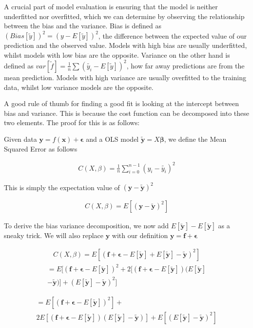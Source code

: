 \documentclass[twocolumn,10pt,cleanfoot]{asme2ej}
\begin{document}
A crucial part of model evaluation is ensuring that the model is neither underfitted nor overfitted, which we can determine by observing the relationship between the bias and the variance. Bias is defined as $(Bias[\tilde{y}])^2 = (y-E[\tilde{y}])^2$, the difference between the expected value of our prediction and the observed value. Models with high bias are usually underfitted, whilst models with low bias are the opposite. Variance on the other hand is defined as $var[\tilde{f}] = \frac{1}{n}\sum(\tilde{y_i}-E[\tilde{y}])^2$, how far away predictions are from the mean prediction. Models with high variance are usually overfitted to the training data, whilst low variance models are the opposite.

A good rule of thumb for finding a good fit is looking at the intercept between bias and variance. This is because the cost function can be decomposed into these two elements. The proof for this is as follows:

Given data $\bm{y} = f(\bm{x}) + \bm{\epsilon}$ and a OLS model $\bm{\tilde{y}} = X\bm{\beta}$, we define
the Mean Squared Error as follows

\begin{gather}
C(X,\beta) = \frac{1}{n}\sum_{i=0}^{n-1}(y_i - \tilde{y_i})^2
\end{gather}

This is simply the expectation value of $(\bm{y} - \bm{\tilde{y}})^2$

\begin{gather}
C(X,\beta) = E\left[(\bm{y} - \bm{\tilde{y}})^2\right]
\end{gather}

To derive the bias variance decomposition, we now add $E[\bm{\tilde{y}}] - E[\bm{\tilde{y}}]$ 
as a sneaky trick. We will also replace $\bm{y}$ with our definition $\bm{y} = \bm{f} + \bm{\epsilon}$

\begin{gather}
C(X,\beta) = E\left[(\bm{f} + \bm{\epsilon} - E[\bm{\tilde{y}}] + E[\bm{\tilde{y}}] - \bm{\tilde{y}})^2\right]
\end{gather}
\begin{multline}
= E[(\bm{f} + \bm{\epsilon} - E[\bm{\tilde{y}}])^2 + 2[(\bm{f} + \bm{\epsilon} - E[\bm{\tilde{y}}])(E[\bm{\tilde{y}}] \\
	- \bm{\tilde{y}})] +(E[\bm{\tilde{y}}] - \bm{\tilde{y}})^2]
\end{multline}

\begin{multline}
= E[(\bm{f} + \bm{\epsilon} - E[\bm{\tilde{y}}])^2] + \\
	2E[(\bm{f} + \bm{\epsilon} - E[\bm{\tilde{y}}])(E[\bm{\tilde{y}}] - \bm{\tilde{y}})] + E[(E[\bm{\tilde{y}}] - \bm{\tilde{y}})^2]
\end{multline}
\end{document}
